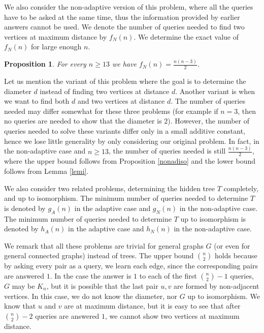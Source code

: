 \documentclass[12pt,a4paper]{amsart}
\theoremstyle{plain}
\newtheorem{proposition}[theorem]{Proposition}
\theoremstyle{definition}
\begin{document}
We also consider the non-adaptive version of this problem, where all the queries have to be asked at the same time, thus the information provided by earlier answers cannot be used. We denote the number of queries needed to find two vertices at maximum distance by $f_N(n)$. We determine the exact value of $f_N(n)$ for large enough $n$.

\begin{proposition}\label{nonaddia}
    For every $n \geq 13$ we have $f_N(n)=\frac{n(n-3)}{2}$.
\end{proposition}

Let us mention the variant of this problem where the goal is to determine the diameter $d$ instead of finding two vertices at distance $d$. Another variant is when we want to find both $d$ and two vertices at distance $d$. The number of queries needed may differ somewhat for these three problems (for example if $n=3$, then no queries are needed to show that the diameter is $2$). However, the number of queries needed to solve these variants differ only in a small additive constant, hence we lose little generality by only considering our original problem. In fact, in the non-adaptive case and $n\ge 13$,
the number of queries needed is still $\frac{n(n-3)}{2}$, where the upper bound follows from Proposition \ref{nonadiso} and the lower bound follows from Lemma \ref{lemi}.

We also consider two related problems, determining the hidden tree $T$ completely, and up to isomorphism. The minimum number of queries needed to determine $T$ is denoted by $g_A(n)$ in the adaptive case and $g_N(n)$ in the non-adaptive case. The minimum number of queries needed to determine $T$ up to isomorphism is denoted by $h_A(n)$ in the adaptive case and $h_N(n)$ in the non-adaptive case.

We remark that all these problems are trivial for general graphs $G$ (or even for general connected graphs) instead of trees. The upper bound $\binom{n}{2}$ holds because by asking every pair as a query, we learn each edge, since the corresponding pairs are answered $1$. In the case the answer is $1$ to each of the first $\binom{n}{2}-1$ queries, $G$ may be $K_n$, but it is possible that the last pair $u,v$ are formed by non-adjacent vertices. In this case, we do not know the diameter, nor $G$ up to isomorphism. We know that $u$ and $v$ are at maximum distance, but it is easy to see that after $\binom{n}{2}-2$ queries are answered $1$, we cannot show two vertices at maximum distance.
\end{document}
